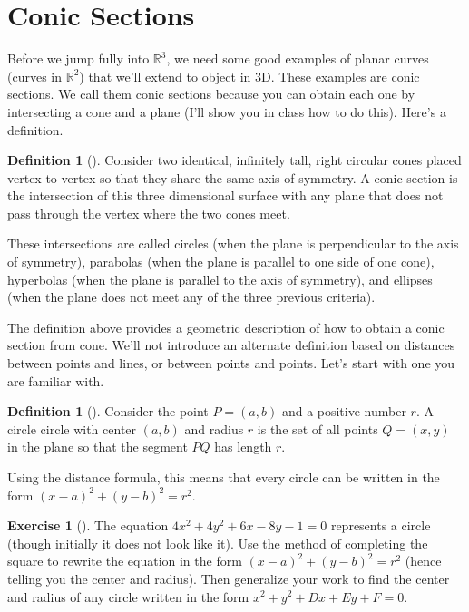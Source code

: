 \documentclass[10pt,]{book}
\theoremstyle{plain}
\theoremstyle{definition}
\newtheorem{definition}[theorem]{Definition}
\theoremstyle{definition}
\theoremstyle{definition}
\theoremstyle{definition}
\newtheorem{exploration}[project]{Exercise}
\theoremstyle{definition}
\numberwithin{equation}{section}
\begin{document}
\section[{Conic Sections}]{Conic Sections}\label{section-11}
Before we jump fully into \(\mathbb{R}^3\), we need some good examples of planar curves (curves in \(\mathbb{R}^2\)) that we'll extend to object in 3D. These examples are conic sections. We call them conic sections because you can obtain each one by intersecting a cone and a plane (I'll show you in class how to do this). Here's a definition.%
\begin{definition}[{}]\label{definition-12}
Consider two identical, infinitely tall, right circular cones placed vertex to vertex so that they share the same axis of symmetry. A conic section is the intersection of this three dimensional surface with any plane that does not pass through the vertex where the two cones meet.%
\end{definition}
These intersections are called circles (when the plane is perpendicular to the axis of symmetry), parabolas (when the plane is parallel to one side of one cone), hyperbolas (when the plane is parallel to the axis of symmetry), and ellipses (when the plane does not meet any of the three previous criteria).%
\par
The definition above provides a geometric description of how to obtain a conic section from cone. We'll not introduce an alternate definition based on distances between points and lines, or between points and points. Let's start with one you are familiar with.%
\begin{definition}[{}]\label{definition-13}
Consider the point \(P=(a,b)\) and a positive number \(r.\) A circle circle with center \((a,b)\) and radius \(r\) is the set of all points \(Q=(x,y)\) in the plane so that the segment \(PQ\) has length \(r\).%
\end{definition}
Using the distance formula, this means that every circle can be written in the form \((x-a)^2+(y-b)^2=r^2\).%
\begin{exploration}[]\label{exploration-54}
The equation \(4x^2+4y^2+6x-8y-1=0\) represents a circle (though initially it does not look like it). Use the method of completing the square to rewrite the equation in the form \((x-a)^2 + (y-b)^2 = r^2\) (hence telling you the center and radius). Then generalize your work to find the center and radius of any circle written in the form \(x^2+y^2+Dx+Ey+F=0\).%
\end{exploration}
\typeout{************************************************}
\typeout{************************************************}
\end{document}
